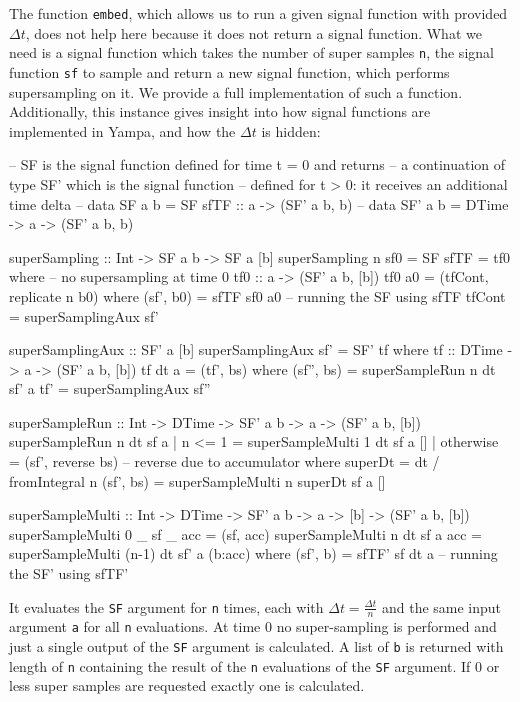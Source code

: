The function \texttt{embed}, which allows us to run a given signal function with provided $\Delta t$, does not help here because it does not return a signal function. What we need is a signal function which takes the number of super samples \texttt{n}, the signal function \texttt{sf} to sample and return a new signal function, which performs supersampling on it. We provide a full implementation of such a function. Additionally, this instance gives insight into how signal functions are implemented in Yampa, and how the $\Delta t$ is hidden:

\begin{HaskellCode}
-- SF is the signal function defined for time t = 0 and returns
-- a continuation of type SF' which is the signal function 
-- defined for t > 0: it receives an additional time delta
-- data SF a b  = SF { sfTF :: a -> (SF' a b, b) }
-- data SF' a b = DTime -> a -> (SF' a b, b)

superSampling :: Int -> SF a b -> SF a [b]
superSampling n sf0 = SF { sfTF = tf0 }
  where
    -- no supersampling at time 0
    tf0 :: a -> (SF' a b, [b])
    tf0 a0 = (tfCont, replicate n b0)
      where
        (sf', b0) = sfTF sf0 a0 -- running the SF using sfTF 
        tfCont    = superSamplingAux sf'

    superSamplingAux :: SF' a [b]
    superSamplingAux sf' = SF' tf
      where
        tf :: DTime -> a -> (SF' a b, [b])
        tf dt a = (tf', bs)
          where
            (sf'', bs) = superSampleRun n dt sf' a
            tf'        = superSamplingAux sf''

    superSampleRun :: Int -> DTime -> SF' a b -> a -> (SF' a b, [b])
    superSampleRun n dt sf a 
        | n <= 1    = superSampleMulti 1 dt sf a []
        | otherwise = (sf', reverse bs)  -- reverse due to accumulator
      where
        superDt   = dt / fromIntegral n
        (sf', bs) = superSampleMulti n superDt sf a []

    superSampleMulti :: Int -> DTime -> SF' a b -> a -> [b] -> (SF' a b, [b])
    superSampleMulti 0 _ sf _ acc  = (sf, acc)
    superSampleMulti n dt sf a acc = superSampleMulti (n-1) dt sf' a (b:acc) 
      where
        (sf', b) = sfTF' sf dt a -- running the SF' using sfTF'
\end{HaskellCode}

It evaluates the \texttt{SF} argument for \texttt{n} times, each with $\Delta t = \frac{\Delta t}{n}$ and the same input argument \texttt{a} for all \texttt{n} evaluations. At time 0 no super-sampling is performed and just a single output of the \texttt{SF} argument is calculated. A list of \texttt{b} is returned with length of \texttt{n} containing the result of the \texttt{n} evaluations of the \texttt{SF} argument. If 0 or less super samples are requested exactly one is calculated. %

